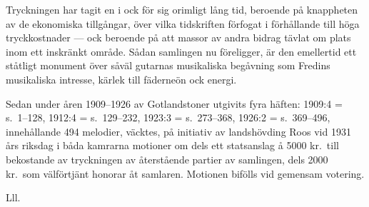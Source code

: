\documentclass[a4paper,english]{article}
\begin{document}
Tryckningen har tagit en i ock för sig orimligt lång tid, beroende
på knappheten av de ekonomiska tillgångar, över vilka tidskriften
förfogat i förhållande till höga tryckkostnader --- ock beroende på
att massor av andra bidrag tävlat om plats inom ett inskränkt område.
Sådan samlingen nu föreligger, är den emellertid ett ståtligt monument
över såväl gutarnas musikaliska begåvning som Fredins musikaliska
intresse, kärlek till fäderneön ock energi.

Sedan under åren 1909--1926 av \guillemotright{}Gotlandstoner\guillemotright{} utgivits fyra
häften: 1909:4 = s.\ 1--128, 1912:4 = s.\ 129--232, 1923:3 = s.\ 
273--368, 1926:2 = s.\ 369--496, innehållande 494 melodier, väcktes,
på initiativ av landshövding Roos vid 1931 års riksdag i båda
kamrarna motioner om dels ett statsanslag å 5000 kr.\ till bekostande
av tryckningen av återstående partier av samlingen, dels 2000 kr.\ 
som välförtjänt honorar åt samlaren. Motionen bifölls vid gemensam
votering.

Lll.
\end{document}
